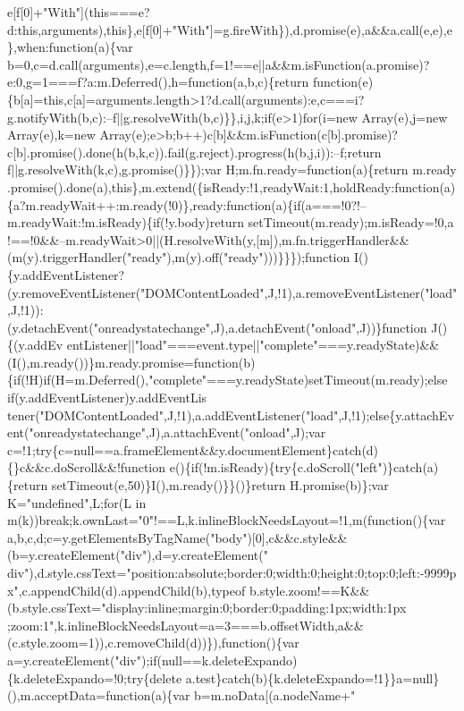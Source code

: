\begin{DoxyCode}
{       e[f[0]+"With"](this===e?d:this,arguments),this\},e[f[0]+"With"]=g.fireWith\}),d.promise(e),a&&a.call(e,e),e\},when:function(a)\{var
       b=0,c=d.call(arguments),e=c.length,f=1!==e||a&&m.isFunction(a.promise)?e:0,g=1===f?a:m.Deferred(),h=function(a,b,c)\{return
       function(e)\{b[a]=this,c[a]=arguments.length>1?d.call(arguments):e,c===i?g.notifyWith(b,c):--f||g.resolveWith(b,c)\}\},i,j,k;if(e>1)for(i=new Array(e),j=new
       Array(e),k=new
       Array(e);e>b;b++)c[b]&&m.isFunction(c[b].promise)?c[b].promise().done(h(b,k,c)).fail(g.reject).progress(h(b,j,i)):--f;return f||g.resolveWith(k,c),g.promise()\}\});var H;m.fn.ready=function(a)\{return
       m.ready
      .promise().done(a),this\},m.extend(\{isReady:!1,readyWait:1,holdReady:function(a)\{a?m.readyWait++:m.ready(!0)\},ready:function(a)\{if(a===!0?!--m.readyWait:!m.isReady)\{if(!y.body)return
       setTimeout(m.ready);m.isReady=!0,a
      !==!0&&--m.readyWait>0||(H.resolveWith(y,[m]),m.fn.triggerHandler&&(m(y).triggerHandler("ready"),m(y).off("ready")))\}\}\});function
       I()\{y.addEventListener?(y.removeEventListener("DOMContentLoaded",J,!1),a.removeEventListener("load",J,!1)):(y.detachEvent("onreadystatechange",J),a.detachEvent("onload",J))\}function
       J()\{(y.addEv
      entListener||"load"===event.type||"complete"===y.readyState)&&(I(),m.ready())\}m.ready.promise=function(b)\{if(!H)if(H=m.Deferred(),"complete"===y.readyState)setTimeout(m.ready);else
       if(y.addEventListener)y.addEventLis
      tener("DOMContentLoaded",J,!1),a.addEventListener("load",J,!1);else\{y.attachEvent("onreadystatechange",J),a.attachEvent("onload",J);var
       c=!1;try\{c=null==a.frameElement&&y.documentElement\}catch(d)\{\}c&&c.doScroll&&!function e()\{if(!m.isReady)\{try\{c.doScroll("left")\}catch(a)\{return setTimeout(e,50)\}I(),m.ready()\}\}()\}return
       H.promise(b)\};var K="undefined",L;for(L in
       m(k))break;k.ownLast="0"!==L,k.inlineBlockNeedsLayout=!1,m(function()\{var
       a,b,c,d;c=y.getElementsByTagName("body")[0],c&&c.style&&(b=y.createElement("div"),d=y.createElement("
      div"),d.style.cssText="position:absolute;border:0;width:0;height:0;top:0;left:-9999px",c.appendChild(d).appendChild(b),typeof
       b.style.zoom!==K&&(b.style.cssText="display:inline;margin:0;border:0;padding:1px;width:1px
      ;zoom:1",k.inlineBlockNeedsLayout=a=3===b.offsetWidth,a&&(c.style.zoom=1)),c.removeChild(d))\}),function()\{var a=y.createElement("div");if(null==k.deleteExpando)\{k.deleteExpando=!0;try\{delete
       a.test\}catch(b)\{k.deleteExpando=!1\}\}a=null\}(),m.acceptData=function(a)\{var b=m.noData[(a.nodeName+"
}
\end{DoxyCode}
